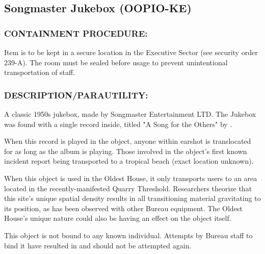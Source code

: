 \subsection*{Songmaster Jukebox (OOPIO-KE)}
\subsubsection*{CONTAINMENT PROCEDURE:}
\par Item is to be kept in a secure location in
the Executive Sector (see security order
239-A). The room must be sealed before
usage to prevent unintentional
transportation of staff.
\subsubsection*{DESCRIPTION/PARAUTILITY:}
\par A classic 1950s jukebox, made by
Songmaster Entertainment LTD. The Jukebox was found with a
single record inside, titled "A Song for the Others" by .
\par When this record is played in the object, anyone within earshot is
translocated for as long as the album is playing. Those involved in
the object's first known incident report being transported to a
tropical beach (exact location unknown).
\par When this object is used in the Oldest House, it only transports
users to an area located in the recently-manifested Quarry
Threshold. Researchers theorize that this site's unique spatial
density results in all transitioning material gravitating to its
position, as has been observed with other Bureau equipment. The
Oldest House's unique nature could also be having an effect on
the object itself.
\par This object is not bound to any known individual. Attempts by
Bureau staff to bind it have resulted in  and should
not be attempted again.
